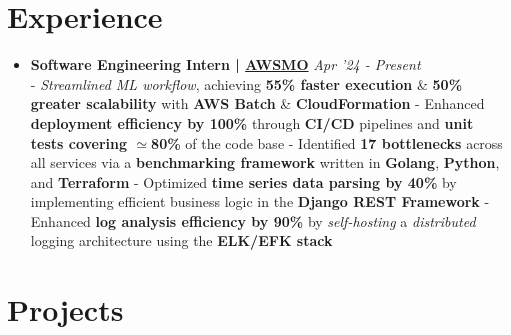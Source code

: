 \documentclass[a4paper,10pt]{extarticle} %
\begin{document}
\section{\textcolor{primary}{Experience}}
\vspace{+0.1cm}

\begin{itemize}[leftmargin=0.55cm, rightmargin=0.2cm, label={\Large\textbullet}]

\item \textbf{Software Engineering Intern | \href{https://awsmo.ai/}{AWSMO}} \hfill{\textit{Apr '24 - Present}} \\
- \textit{Streamlined ML workflow}, achieving \textbf{55\% faster execution} \& \textbf{50\% greater scalability} with \textbf{AWS Batch} \& \textbf{CloudFormation} \newline
- Enhanced \textbf{deployment efficiency by 100\%} through \textbf{CI/CD} pipelines and \textbf{unit tests covering $\simeq$80\%} of the code base \newline
- Identified \textbf{17 bottlenecks} across all services via a \textbf{benchmarking framework} written in \textbf{Golang}, \textbf{Python}, and \textbf{Terraform} \newline
- Optimized \textbf{time series data parsing by 40\%} by implementing efficient business logic in the \textbf{Django REST Framework} \newline
- Enhanced \textbf{log analysis efficiency by 90\%} by \textit{self-hosting} a \textit{distributed} logging architecture using the \textbf{ELK/EFK stack}

\end{itemize}


 \vspace{0.2cm}
\section{\textcolor{primary}{Projects}}
 \vspace{0.1cm}
\end{document}
